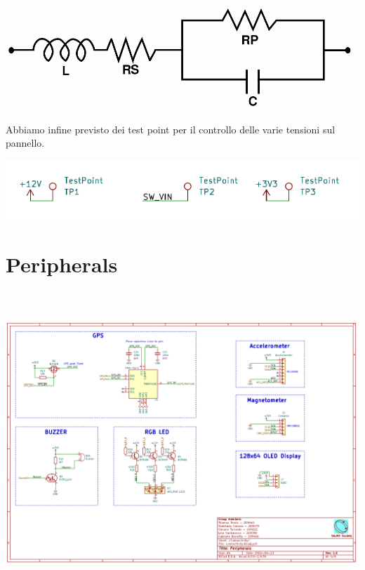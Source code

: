 \begin{center}
\includegraphics[scale=0.8]{figures/image37.png}
\captionsetup{type=figure}
\end{center}

Abbiamo infine previsto dei test point per il controllo delle varie
tensioni sul pannello.

\begin{center}
\includegraphics[scale=1]{figures/image78.png}
\captionsetup{type=figure}
\end{center}

\hypertarget{peripherals}{%
\section{Peripherals}\label{peripherals}}

\begin{center}
\includegraphics[width=6.5in,height=4.48611in]{figures/image15.png}
\captionsetup{type=figure}
\end{center}

